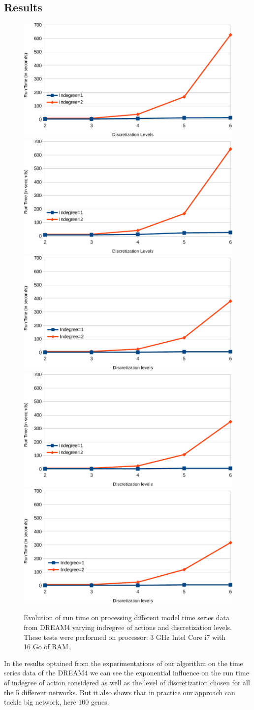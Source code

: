 \subsection{Results}

	\begin{figure} \centering
	\includegraphics[width=0.32\linewidth]{images/net1}
	\includegraphics[width=0.32\linewidth]{images/net2}
	\includegraphics[width=0.32\linewidth]{images/net3}
	\includegraphics[width=0.33\linewidth]{images/net4}
	\includegraphics[width=0.33\linewidth]{images/net5}
	\label{fig:run_time}
	\caption{Evolution of run time on processing different model time series data from DREAM4 varying indregree of actions and discretization levels. These tests were performed on processor: 3 GHz Intel Core i7 with 16 Go of RAM. }
	\end{figure}

	In the results optained from the experimentations of our algorithm on the time series data of the DREAM4 we can see the exponential influence on the run time of indegree of action considered as well as the level of discretization chosen for all the 5 different networks.
	But it also shows that in practice our approach can tackle big network, here 100 genes.

